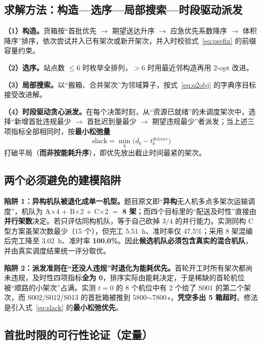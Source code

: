 \subsection{求解方法：构造—选序—局部搜索—时段驱动派发}

\textbf{（1）构造。}货箱按“首批优先 $\to$ 期望送达升序 $\to$ 应急优先系数降序 $\to$ 体积降序”排序，依次尝试并入已有架次或新开架次，并入时校验式~\eqref{eq:prefix} 的前缀容量约束。

\textbf{（2）选序。}站点数 $\le6$ 时枚举全排列，$>6$ 时用最近邻构造再用 2-opt 改进。

\textbf{（3）局部搜索。}以“搬箱、合并架次”为邻域算子，按式~\eqref{eq:q2obj} 的字典序目标接受改进解。

\textbf{（4）时段驱动贪心派发。}在每个决策时刻，从“资源已就绪”的未调度架次中，选择“新增首批违规最少 $\to$ 首批迟到量最少 $\to$ 期望违规最少”者派发；当上述三项指标全部相同时，按\textbf{最小松弛量}
\begin{equation}
	\text{slack}=\min_{b}\bigl(d_{b}-t_{b}^{deliver}\bigr)
	\label{eq:slack}
\end{equation}
打破平局（\textbf{而非按能耗升序}），即优先放出截止时间最紧的架次。

\subsection{两个必须避免的建模陷阱}\label{sec:q2traps}

\textbf{陷阱 1：异构机队被退化成单一机型。}题目原文即“\textbf{异构}无人机多点多架次运输调度”，机队为 A$\times$4 $+$ B$\times$2 $+$ C$\times$2 $=$ \textbf{8 架}；而四个目标里的“配送及时性”直接由\textbf{并行架数}决定。若只评估同构机队，等于自己砍掉 $3/4$ 的并行能力。实测同构 C 型方案虽架次数最少（15 个），但完工 \SI{5.51}{h}、准时率仅 47.5\%；采用 8 架混编后完工降至 \SI{3.02}{h}、准时率 \textbf{100.0\%}。因此\textbf{候选机队必须包含真实的混合机队}，并由真实调度结果统一评分取优。

\textbf{陷阱 2：派发准则在“还没人违规”时退化为能耗优先。}首轮开工时所有架次都尚未违规，及时性四项指标\textbf{全为 0}，排序实际由能耗决定，于是稀缺的首轮机位被“顺路的小架次”占满。实测 $t=0$ 的 8 个机位中有 2 个给了 S001 的第二个架次，而 S002/S012/S013 的首批箱被推到 5800$\sim$7800\,s，\textbf{凭空多出 5 箱超时}。修法是引入式~\eqref{eq:slack} 的\textbf{最小松弛优先}。

\subsection{首批时限的可行性论证（定量）}

